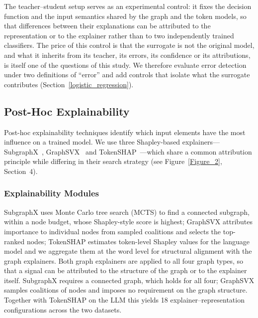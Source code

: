 The teacher--student setup serves as an experimental control: it fixes the decision function and the input semantics shared by the graph and the token models, so that differences between their explanations can be attributed to the representation or to the explainer rather than to two independently trained classifiers. The price of this control is that the surrogate is not the original model, and what it inherits from its teacher, its errors, its confidence or its attributions, is itself one of the questions of this study. We therefore evaluate error detection under two definitions of ``error'' and add controls that isolate what the surrogate contributes (Section~\ref{logistic_regression}).

\subsection{Post-Hoc Explainability}
\label{explainability}

Post-hoc explainability techniques identify which input elements have the most influence on a trained model. We use three Shapley-based explainers---SubgraphX~\cite{yuan2021explainabilitygraphneuralnetworks}, GraphSVX~\cite{duval2021graphsvxshapleyvalueexplanations} and TokenSHAP~\cite{goldshmidt2024tokenshapinterpretinglargelanguage}---which share a common attribution principle while differing in their search strategy (see Figure~\ref{Figure_2}, Section~4).

\subsubsection{Explainability Modules}

SubgraphX uses Monte Carlo tree search (MCTS) to find a connected subgraph, within a node budget, whose Shapley-style score is highest; GraphSVX attributes importance to individual nodes from sampled coalitions and selects the top-ranked nodes; TokenSHAP estimates token-level Shapley values for the language model and we aggregate them at the word level for structural alignment with the graph explainers. Both graph explainers are applied to all four graph types, so that a signal can be attributed to the structure of the graph or to the explainer itself. SubgraphX requires a connected graph, which holds for all four; GraphSVX samples coalitions of nodes and imposes no requirement on the graph structure. Together with TokenSHAP on the LLM this yields 18 explainer--representation configurations across the two datasets.

